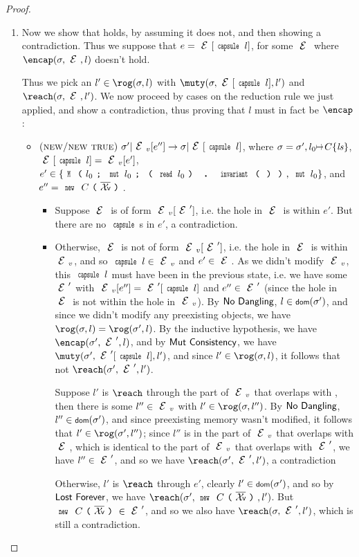 \begin{proof}
\begin{enumerate}
	\item Now we show that  holds, by assuming it does not, and then showing a contradiction. Thus we suppose that $e = \E[\Kw{capsule}\,l]$, for some $\E$ where $\encap(\s,\E,l)$
		doesn't hold.
		\LSenum
		
		Thus we pick an $l'\in\rog(\s,l)$ with $\muty(\s,\E[\Kw{capsule}\,l],l')$
		and $\reach(\s,\E,l')$.		
		We now proceed by cases on the reduction rule we just applied, and
		show a contradiction, thus proving that $l$ must in fact be $\encap$:
		\begin{itemize}
			\item $\crule{new/new true}{\s'}{\EV[e'']}{\s}{\E[\Kw{capsule}\,l]}$, where
			$\s = \s',l_0\mapsto C\{\ls\}$, $\E[\Kw{capsule}\,l] = \EV[e']$, $e'\in\{\M{l_0}{\Kw{mut}\,l_0}{\invariant{l_0}},\,\Kw{mut}\,l_0\}$,
			and $e'' = \new C{\vs}$.
			\begin{itemize}
				\item Suppose $\E$ is of form $\EV[\E']$, i.e. the hole in $\E$ is within
				$e'$.
					But there are no $\Kw{capsule}$s in $e'$, a contradiction.

				\item Otherwise, $\E$ is not of form $\EV[\E']$, i.e. the hole in $\E$
				is within $\EV$, and so $\Kw{capsule}\,l\in\EV$ and $e'\in\E$.
					As we didn't modify $\EV$, this $\Kw{capsule}\,l$ must have been in the
					previous state, i.e. we have some $\E'$ with $\EV[e''] = \E'[\Kw{capsule}\,l]$
					and $e''\in\E'$ (since the hole in $\E$ is not within the hole
					in $\EV$).
					By $\textsf{No Dangling}$, $l\in\dom(\s')$, and since we didn't
					modify any preexisting objects, we have $\rog(\s,l) = \rog(\s',l)$.
					By the inductive hypothesis, we have $\encap(\s',\E',l)$, and by $\textsf{Mut Consistency}$,
					we have $\muty(\s',\E'[\Kw{capsule}\,l],l')$, and since $l'\in\rog(\s,l)$,
					it follows that not $\reach(\s',\E',l')$.
					\LSiitem
					
					Suppose $l'$ is $\reach$ through the part of $\EV$ that overlaps with \E, then there is some $l''\in\EV$
					with $l'\in\rog(\s,l'')$. By $\textsf{No Dangling}$, $l''\in\dom(\s')$,
					and since preexisting memory wasn't modified, it follows that $l'\in\rog(\s',l'')$;
					since $l''$ is in the part of $\EV$ that overlaps with $\E$, which is identical to the part of $\EV$ that overlaps with $\E'$,
					we have $l''\in\E'$, and so we have $\reach(\s',\E',l')$, a contradiction
					\LSiitem
					
					Otherwise, $l'$ is $\reach$ through $e'$, clearly $l'\in\dom(\s')$,
					and so by $\textsf{Lost Forever}$, we have $\reach(\s',\new C{\vs},l')$.
					But $\new C{\vs}\in\E'$, and so we also have $\reach(\s,\E',l')$,
					which is still a contradiction.
					\LSiitem
					

\end{itemize}
\end{itemize}
\end{enumerate}
\end{proof}

